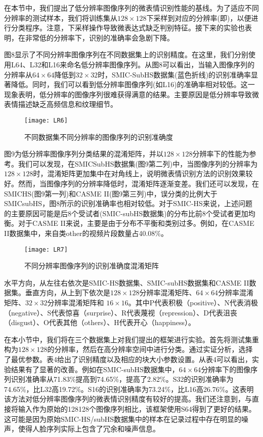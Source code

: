 在本节中，我们提出了低分辨率图像序列的微表情识别性能的基线。为了适应不同分辨率的测试样本，我们将训练集从$ 128 \times 128 $下采样到对应的分辨率(即)，以便进行分类程序。注意，下采样操作导致微表达式缺乏判别特征。接下来的实验也表明，在非常低的分辨率下，识别的准确率会急剧下降。

图8显示了不同分辨率图像序列在不同数据集上的识别精度。在这里，我们分别使用L64、L32和L16来命名低分辨率图像序列。从图8可以看出，当输入图像序列的分辨率从$ 64 \times 64 $降低到$ 32 \times 32 $时，SMIC-SubHS数据集(蓝色折线)的识别准确率显著降低。同时，我们可以看到低分辨率图像序列(如L16)的准确率相对较低。这一现象表明，低分辨率的图像序列很难获得满意的结果。主要原因是低分辨率导致微表情描述缺乏高频信息和纹理细节。

\begin{figure}[!htbp]
\centering
\texttt{[image: LR6]}
\caption{不同数据集不同分辨率的图像序列的识别准确度}
\label{fig16}
\end{figure}

图9为低分辨率图像序列分类结果的混淆矩阵，并以$ 128 \times 128 $分辨率下的性能为参考。我们可以发现，在SMICSubHS数据集(图9第二列)中，当图像序列的分辨率为$ 128 \times 128 $时，混淆矩阵更加集中在对角线上，说明微表情识别方法的识别效果较好。然而，当图像序列的分辨率降低时，混淆矩阵逐渐变差。我们还可以发现，在SMICHS(图9第一列)和CASME II(图9第三列)中，误分类的比例大于SMICsubHS，图8所示的识别准确率也相对较低。对于SMIC-HS来说，上述问题的主要原因可能是后8个受试者(SMIC-subHS数据集)的分布比前8个受试者更加均衡。对于CASME II来说，主要是由于分布不平衡和类别过多。例如，在CASME II数据集中，来自类other的视频片段数量占40.08\%。

\begin{figure}[]
\centering
\texttt{[image: LR7]}
\caption{不同分辨率图像序列的识别准确度混淆矩阵}
\label{fig17}
\end{figure}

水平方向，从左往右依次是SMIC-HS数据集、SMIC-subHS数据集和CASME II数据集。垂直方向，从上到下依次是$ 128 \times 128 $分辨率混淆矩阵、$ 64 \times 64 $分辨率混淆矩阵、$ 32 \times 32 $分辨率混淆矩阵和 $ 16 \times 16 $。其中P代表积极（positive）、N代表消极（negative）、S代表惊喜（surprise）、R代表蔑视（repression）、D代表沮丧（disgust）、O代表其他（others）、H代表开心（happiness）。

在本小节中，我们将在三个数据集上对我们提出的框架进行实验。首先将测试集重构为$ 128 \times 128 $的分辨率，然后在高分辨率空间中进行分类。通过实证分析，选择了最优参数。表4给出了识别精度以及相应的块大小参数设置。从表4可以看出，实验结果有了显著的改善。例如在SMIC-subHS数据集中，$ 64 \times 64 $分辨率下的图像序列识别准确率从71.83\%提高到74.65\%，提高了2.82\%。S32的识别准确率为74.65\%，比L32高19.72\%。S16的识别准确率为73.24\%，比L16高26.76\%。这表明该方法对低分辨率图像序列的微表情识别精度有较好的提高。我们还注意到，与直接将输入作为原始的128128个图像序列相比，该框架使用S64得到了更好的结果。这可能是因为原始SMIC-HS/subHS数据集中的样本在记录过程中存在明显的噪声，使得人脸序列实际上包含了冗余和噪声信息。

